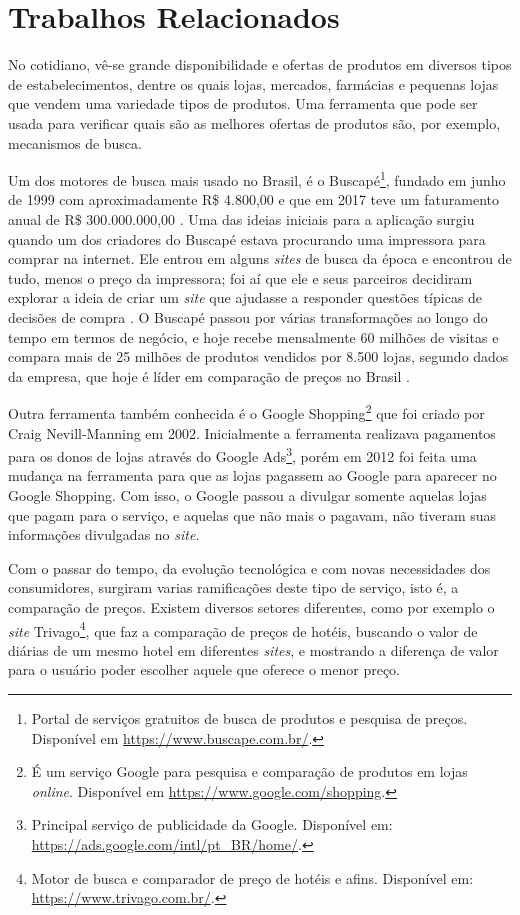 \section{Trabalhos Relacionados}
\label{sec:trabalhos-relacionados}

No cotidiano, vê-se grande disponibilidade e ofertas de produtos em diversos tipos de estabelecimentos, dentre os quais lojas, mercados, farmácias e pequenas lojas que vendem uma variedade tipos de produtos. Uma ferramenta que pode ser usada para verificar quais são as melhores ofertas de produtos são, por exemplo, mecanismos de busca.

Um dos motores de busca mais usado no Brasil, é o Buscapé\footnote{Portal de serviços gratuitos de busca de produtos e pesquisa de preços. Disponível em \url{https://www.buscape.com.br/}.}, fundado em junho de 1999 com aproximadamente R\$ 4.800,00 e que em 2017 teve um faturamento anual de R\$ 300.000.000,00 \cite{EmídiaFelipe2017BUSCAPÉ}. Uma das ideias iniciais para a aplicação surgiu quando um dos criadores do Buscapé estava procurando uma impressora para comprar na internet. Ele entrou em alguns \textit{sites} de busca da época e encontrou de tudo, menos o preço da impressora; foi aí que ele e seus parceiros decidiram explorar a ideia de criar um \textit{site} que ajudasse a responder questões típicas de decisões de compra \cite{Arruda2011Buscapé}. O Buscapé passou por várias transformações ao longo do tempo em termos de negócio, e hoje recebe mensalmente 60 milhões de visitas e compara mais de 25 milhões de produtos vendidos por 8.500 lojas, segundo dados da empresa, que hoje é líder em comparação de preços no Brasil \cite{Heloísa2017Startups}.

Outra ferramenta também conhecida é o Google Shopping\footnote{É um serviço Google para pesquisa e comparação de produtos em lojas \textit{online}. Disponível em \url{https://www.google.com/shopping}.} que foi criado por Craig Nevill-Manning em 2002. Inicialmente a ferramenta realizava pagamentos para os donos de lojas através do Google Ads\footnote{Principal serviço de publicidade da Google. Disponível em: \url{https://ads.google.com/intl/pt_BR/home/}.}, porém em 2012 foi feita uma mudança na ferramenta para que as lojas pagassem ao Google para aparecer no Google Shopping. Com isso, o Google passou a divulgar somente aquelas lojas que pagam para o serviço, e aquelas que não mais o pagavam, não tiveram suas informações divulgadas no \textit{site}.

Com o passar do tempo, da evolução tecnológica e com novas necessidades dos consumidores, surgiram varias ramificações deste tipo de serviço, isto é, a comparação de preços. Existem diversos setores diferentes, como por exemplo o \textit{site} Trivago\footnote{Motor de busca e comparador de preço de hotéis e afins. Disponível em: \url{https://www.trivago.com.br/}.}, que faz a comparação de preços de hotéis, buscando o valor de diárias de um mesmo hotel em diferentes \textit{sites}, e mostrando a diferença de valor para o usuário poder escolher aquele que oferece o menor preço.

